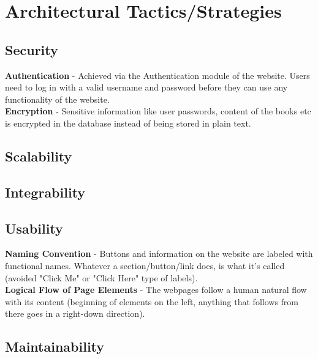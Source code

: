\section{Architectural Tactics/Strategies}

\subsection{Security}
\par{\textbf{Authentication} - Achieved via the Authentication module of the website. Users need to log in with a valid username and password before they can use any functionality of the website. \\\textbf{Encryption} - Sensitive information like user passwords, content of the books etc is encrypted in the database instead of being stored in plain text. }

\subsection{Scalability}

\subsection{Integrability}

\subsection{Usability}
\par{\textbf{Naming Convention} - Buttons and information on the website are labeled with functional names. Whatever a section/button/link does, is what it's called (avoided "Click Me" or "Click Here" type of labels). \\\textbf{Logical Flow of Page Elements} - The webpages follow a human natural flow with its content (beginning of elements on the left, anything that follows from there goes in a right-down direction). }

\subsection{Maintainability}